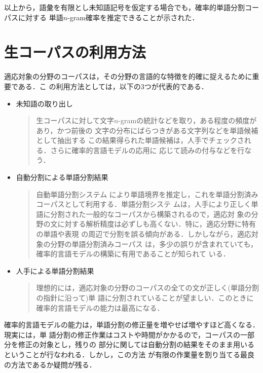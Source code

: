 以上から，語彙を有限とし未知語記号を仮定する場合でも，確率的単語分割コーパスに対する
単語$n$-gram確率を推定できることが示された．

\section{生コーパスの利用方法}
\label{section:raw-corpus}

適応対象の分野のコーパスは，その分野の言語的な特徴を的確に捉えるために重要である．こ
の利用方法としては，以下の3つが代表的である．
\begin{itemize}

\item 未知語の取り出し
  \begin{quote}
    生コーパスに対して文字$n$-gramの統計などを取り，ある程度の頻度があり，かつ前後の
    文字の分布にばらつきがある文字列などを単語候補として抽出する
    \cite{nグラム統計によるコーパスからの未知語抽出}
    \cite{統計的手法による単語の切り出しについて}
    この結果得られた単語候補は，人手でチェックされる．さらに確率的言語モデルの応用に
    応じて読みの付与などを行なう．
  \end{quote}

\item 自動分割による単語分割結果
  \begin{quote}
    自動単語分割システム
    \cite{A.Stochastic.Japanese.Morphological.Analyzer.Using.a.Forward-DP.Backward-A*.N-Best.Search.Algorithm} 
    により単語境界を推定し，これを単語分割済みコーパスとして利用する．単語分割システ
    ムは，人手により正しく単語に分割された一般的なコーパスから構築されるので，適応対
    象の分野の文に対する解析精度は必ずしも高くない．特に，適応分野に特有の単語や表現
    の周辺で分割を誤る傾向がある．しかしながら，適応対象の分野の単語分割済みコーパス
    は，多少の誤りが含まれていても，確率的言語モデルの構築に有用であることが知られて
    いる．
  \end{quote}

\item 人手による単語分割結果
  \begin{quote}
    理想的には，適応対象の分野のコーパスの全ての文が正しく(単語分割の指針に沿って)単
    語に分割されていることが望ましい．このときに確率的言語モデルの能力は最高になる．
  \end{quote}

\end{itemize}

確率的言語モデルの能力は，単語分割の修正量を増やせば増やすほど高くなる．現実には，単
語分割の修正作業はコストや時間がかかるので，コーパスの一部分を修正の対象とし，残りの
部分に関しては自動分割の結果をそのまま用いるということが行なわれる．しかし，この方法
が有限の作業量を割り当てる最良の方法であるか疑問が残る．

